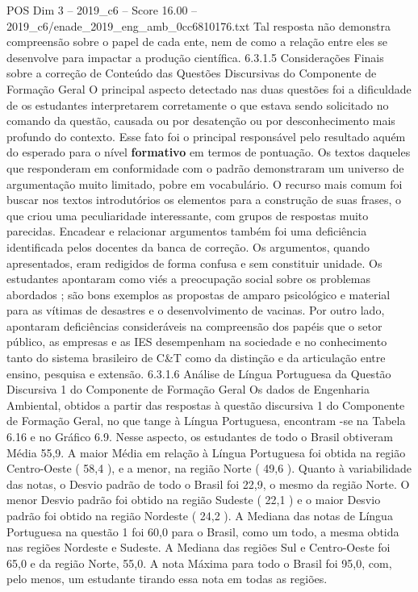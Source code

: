 \begin{textsample}{POS Dim 3 – 2019\_c6 – Score 16.00 – 2019\_c6/enade\_2019\_eng\_amb\_0cc6810176.txt}
Tal resposta não demonstra compreensão sobre o papel de cada ente, nem de como a relação entre eles se desenvolve para impactar a produção científica. 6.3.1.5 Considerações Finais sobre a correção de Conteúdo das Questões Discursivas do Componente de Formação Geral O principal aspecto detectado nas duas questões foi a dificuldade de os estudantes interpretarem corretamente o que estava sendo solicitado no comando da questão, causada ou por desatenção ou por desconhecimento mais profundo do contexto.
Esse fato foi o principal responsável pelo resultado aquém do esperado para o nível \textbf{formativo} em termos de pontuação.
Os textos daqueles que responderam em conformidade com o padrão demonstraram um universo de argumentação muito limitado, pobre em vocabulário.
O recurso mais comum foi buscar nos textos introdutórios os elementos para a construção de suas frases, o que criou uma peculiaridade interessante, com grupos de respostas muito parecidas.
Encadear e relacionar argumentos também foi uma deficiência identificada pelos docentes da banca de correção.
Os argumentos, quando apresentados, eram redigidos de forma confusa e sem constituir unidade.
Os estudantes apontaram como viés a preocupação social sobre os problemas abordados ; são bons exemplos as propostas de amparo psicológico e material para as vítimas de desastres e o desenvolvimento de vacinas.
Por outro lado, apontaram deficiências consideráveis na compreensão dos papéis que o setor público, as empresas e as IES desempenham na sociedade e no conhecimento tanto do sistema brasileiro de C\&T como da distinção e da articulação entre ensino, pesquisa e extensão. 6.3.1.6 Análise de Língua Portuguesa da Questão Discursiva 1 do Componente de Formação Geral Os dados de Engenharia Ambiental, obtidos a partir das respostas à questão discursiva 1 do Componente de Formação Geral, no que tange à Língua Portuguesa, encontram -se na Tabela 6.16 e no Gráfico 6.9.
Nesse aspecto, os estudantes de todo o Brasil obtiveram Média 55,9.
A maior Média em relação à Língua Portuguesa foi obtida na região Centro-Oeste ( 58,4 ), e a menor, na região Norte ( 49,6 ).
Quanto à variabilidade das notas, o Desvio padrão de todo o Brasil foi 22,9, o mesmo da região Norte.
O menor Desvio padrão foi obtido na região Sudeste ( 22,1 ) e o maior Desvio padrão foi obtido na região Nordeste ( 24,2 ).
A Mediana das notas de Língua Portuguesa na questão 1 foi 60,0 para o Brasil, como um todo, a mesma obtida nas regiões Nordeste e Sudeste.
A Mediana das regiões Sul e Centro-Oeste foi 65,0 e da região Norte, 55,0.
A nota Máxima para todo o Brasil foi 95,0, com, pelo menos, um estudante tirando essa nota em todas as regiões.

\end{textsample}
